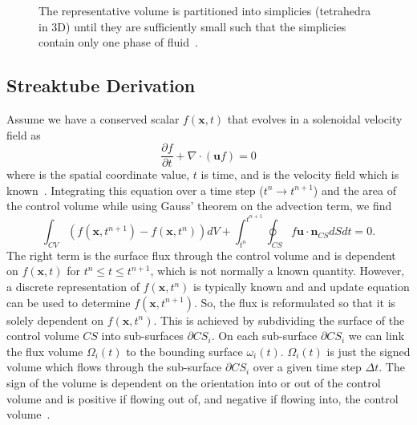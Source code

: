 \begin{figure}[htbp]
\begin{minipage}{0.45\textwidth}
		\caption{The representative volume is partitioned into simplicies (tetrahedra in 3D) until they are sufficiently small such that the simplicies contain only one phase of fluid~\cite{Owkes2014}.}
		\label{fig:simp}
	\end{minipage}
\end{figure}

\subsection{Streaktube Derivation}
Assume we have a conserved scalar $f(\bm{x},t)$ that evolves in a solenoidal velocity field as 
\begin{equation}
\frac{\partial f}{\partial t} + \nabla \cdot (\bm{u} f) = 0
\label{eqn:der1}
\end{equation}
where  is the spatial coordinate value, $t$ is time, and  is the velocity field which is known~\cite{Owkes2014}. Integrating this equation over a time step ($t^n \rightarrow t^{n+1}$) and the area of the control volume while using Gauss' theorem on the advection term, we find 
\begin{equation}
\int_{CV} (  f(\bm{x}, t^{n+1})  - f(\bm{x}, t^{n})  ) dV  + \int_{t^n}^{t^{n+1}} \oint_{CS} f \bm{u} \cdot \bm{n}_{CS} dS dt = 0.
\label{eqn:der2}
\end{equation}
The right term is the surface flux through the control volume and is dependent on $f( \bm{x}, t)$ for $t^n \leq t \leq t^{n+1}$, which is not normally a known quantity. However, a discrete representation of $f( \bm{x}, t^{n})$ is typically known and and update equation can be used to determine $f( \bm{x}, t^{n+1})$. So, the flux is reformulated so that it is solely dependent on $f( \bm{x}, t^{n})$. This is achieved by subdividing the surface of the control volume $CS$ into sub-surfaces $\partial{CS_i}$. On each sub-surface $\partial CS_i$ we can link the flux volume $\Omega_i(t)$ to the bounding surface $\omega_i(t)$. $\Omega_i(t)$ is just the signed volume which flows through the sub-surface $\partial CS_i$ over a given time step $\Delta t$.  The sign of the volume is dependent on the orientation into or out of the control volume and is positive if flowing out of, and negative if flowing into, the control volume~\cite{Owkes2017}. 

